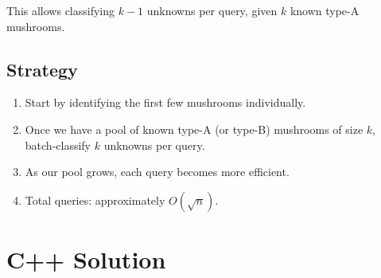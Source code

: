 \documentclass[11pt,a4paper]{article}
\begin{document}
This allows classifying $k-1$ unknowns per query, given $k$ known type-A mushrooms.

\subsection{Strategy}
\begin{enumerate}
  \item Start by identifying the first few mushrooms individually.
  \item Once we have a pool of known type-A (or type-B) mushrooms of size $k$, batch-classify $k$ unknowns per query.
  \item As our pool grows, each query becomes more efficient.
  \item Total queries: approximately $O(\sqrt{n})$.
\end{enumerate}

\section{C++ Solution}
\end{document}
